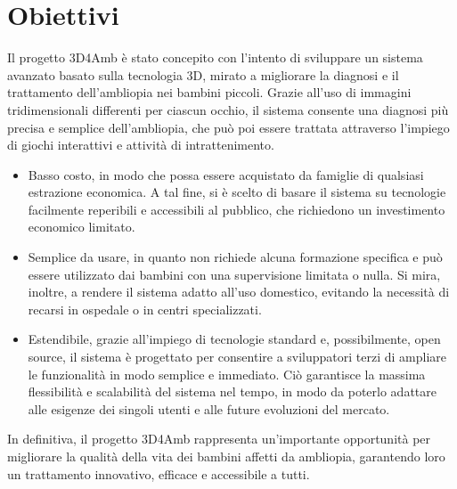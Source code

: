 \documentclass[
a4paper,
cleardoublepage=empty,
headings=twolinechapter,
numbers=autoenddot,
]{scrbook}
\begin{document}
	\section{Obiettivi}
	Il progetto 3D4Amb è stato concepito con l'intento di sviluppare un sistema avanzato basato sulla tecnologia 3D, mirato a migliorare la diagnosi e il trattamento dell'ambliopia nei bambini piccoli. Grazie all'uso di immagini tridimensionali differenti per ciascun occhio, il sistema consente una diagnosi più precisa e semplice dell'ambliopia, che può poi essere trattata attraverso l'impiego di giochi interattivi e attività di intrattenimento.
	\begin{itemize}
		\item Basso costo, in modo che possa essere acquistato da famiglie di qualsiasi estrazione economica. A tal fine, si è scelto di basare il sistema su tecnologie facilmente reperibili e accessibili al pubblico, che richiedono un investimento economico limitato.
		\item Semplice da usare, in quanto non richiede alcuna formazione specifica e può essere utilizzato dai bambini con una supervisione limitata o nulla. Si mira, inoltre, a rendere il sistema adatto all'uso domestico, evitando la necessità di recarsi in ospedale o in centri specializzati.
		\item Estendibile, grazie all'impiego di tecnologie standard e, possibilmente, open source, il sistema è progettato per consentire a sviluppatori terzi di ampliare le funzionalità in modo semplice e immediato. Ciò garantisce la massima flessibilità e scalabilità del sistema nel tempo, in modo da poterlo adattare alle esigenze dei singoli utenti e alle future evoluzioni del mercato.
	\end{itemize}
	In definitiva, il progetto 3D4Amb rappresenta un'importante opportunità per migliorare la qualità della vita dei bambini affetti da ambliopia, garantendo loro un trattamento innovativo, efficace e accessibile a tutti.
	
\end{document}
